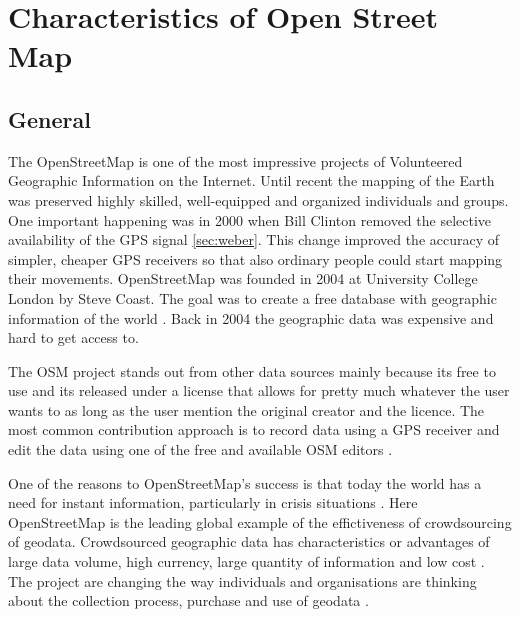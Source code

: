 \chapter{Characteristics of Open Street Map}
	
\section{General}
The OpenStreetMap is one of the most impressive projects of Volunteered Geographic Information on the Internet\cite{Neis2012}. Until recent the mapping of the Earth was preserved highly skilled, well-equipped and organized individuals and groups. One important happening was in 2000 when Bill Clinton removed the selective availability of the GPS signal \ref{sec:weber}. This change improved the accuracy of simpler, cheaper GPS receivers so that also ordinary people could start mapping their movements. OpenStreetMap was founded in 2004 at University College London by Steve Coast. The goal was to create a free database with geographic information of the world \cite{Neis2012}. Back in 2004 the geographic data was expensive and hard to get access to. 

The OSM project stands out from other data sources mainly because its free to use and its released under a license that allows for pretty much whatever the user wants to as long as the user mention the original creator and the licence\cite{Chilton}.  The most common contribution approach is to record data using a GPS receiver and edit the data using one of the free and available OSM editors \cite{Neis2012}.  

One of the reasons to OpenStreetMap's success is that today the world has a need for instant information, particularly in crisis situations \cite{Chilton}. Here OpenStreetMap is the leading global example of the effictiveness of crowdsourcing of geodata. Crowdsourced geographic data has characteristics or advantages of large data volume, high currency, large quantity of information and low cost \cite{Wang2013}. The project are changing the way individuals and organisations are thinking about the collection process, purchase and use of geodata \cite{Chilton}.  


